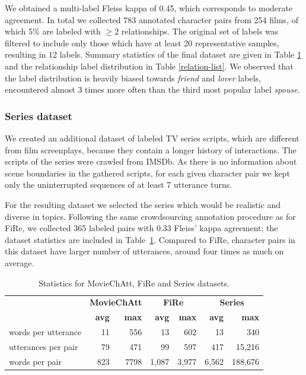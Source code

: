 We obtained a multi-label Fleiss kappa of 0.45, which corresponds to moderate agreement. In total we collected 783 annotated character pairs from 254 films, of which 5\% are labeled with $\ge 2$ relationships. The original set of labels was filtered to include only those which have at least 20 representative samples, resulting in 12 labels. Summary statistics of the final dataset are given in Table \ref{data_stats} and the relationship label distribution in Table \ref{relation-list}. We observed that the label distribution is heavily biased towards \emph{friend} and \emph{lover} labels, encountered almost 3 times more often than the third most popular label \emph{spouse}.

\subsubsection{Series dataset}

We created an additional dataset of labeled TV series scripts, which are different from film screenplays, because they contain a longer history of interactions. The scripts of the series were crawled from \gls{IMSDb}. As there is no information about scene boundaries in the gathered scripts, for each given character pair we kept only the uninterrupted sequences of at least 7 utterance turns. 

For the resulting dataset we selected the series which would be realistic and diverse in topics. Following the same crowdsourcing annotation procedure as for FiRe, we collected 365 labeled pairs with 0.33 Fleiss' kappa agreement; the dataset statistics are included in Table~\ref{data_stats}. Compared to FiRe, character pairs in this dataset have larger number of utterances, around four times as much on average.

\begin{table}[]
    \centering
    \begin{adjustbox}{width=0.65\textwidth}
    \begin{tabular}{@{}lrrrrrr@{}}
                  & \multicolumn{2}{c}{\textbf{MovieChAtt}}  & \multicolumn{2}{c}{\textbf{FiRe}} & \multicolumn{2}{c}{\textbf{Series}}                           \\
                    \cmidrule(lr){2-3} \cmidrule(l){4-5} \cmidrule(l){6-7}
                    & \textbf{avg}      & \textbf{max}        & \textbf{avg}      & \textbf{max} & \textbf{avg}      & \textbf{max} \\ \toprule
words per utterance & 11 & 556 & 13           & 602        & 13                          & 340                     \\
utterances per pair & 79 & 471 & 99           & 597        & \multicolumn{1}{r}{417}     & 15,216                   \\
words per pair  & 823 & 7798    & 1,087        & 3,977      &        6,562              &  188,676     
\end{tabular}
\end{adjustbox}
    \caption{Statistics for MovieChAtt, FiRe and Series datasets.}
    \label{data_stats}
\end{table}

